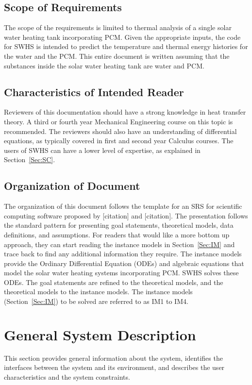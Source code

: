 \documentclass[12pt]{article}
\begin{document}
\subsection{Scope of Requirements}
\label{Sec:SoR}
The scope of the requirements is limited to thermal analysis of a single solar water heating tank incorporating PCM. Given the appropriate inputs, the code for SWHS is intended to predict the temperature and thermal energy histories for the water and the PCM. This entire document is written assuming that the substances inside the solar water heating tank are water and PCM.
\subsection{Characteristics of Intended Reader}
\label{Sec:CoIR}
Reviewers of this documentation should have a strong knowledge in heat transfer theory. A third or fourth year Mechanical Engineering course on this topic is recommended. The reviewers should also have an understanding of differential equations, as typically covered in first and second year Calculus courses. The users of SWHS can have a lower level of expertise, as explained in Section~\ref{Sec:SC}.
\subsection{Organization of Document}
\label{Sec:OoD}
The organization of this document follows the template for an SRS for scientific computing software proposed by [citation] and [citation]. The presentation follows the standard pattern for presenting goal statements, theoretical models, data definitions, and assumptions. For readers that would like a more bottom up approach, they can start reading the instance models in Section~\ref{Sec:IM} and trace back to find any additional information they require. The instance models provide the Ordinary Differential Equation (ODEs) and algebraic equations that model the solar water heating systems incorporating PCM. SWHS solves these ODEs.
The goal statements are refined to the theoretical models, and the theoretical models to the instance models. The instance models (Section~\ref{Sec:IM}) to be solved are referred to as IM1 to IM4.
\section{General System Description}
\label{Sec:GSD}
This section provides general information about the system, identifies the interfaces between the system and its environment, and describes the user characteristics and the system constraints.
\end{document}
